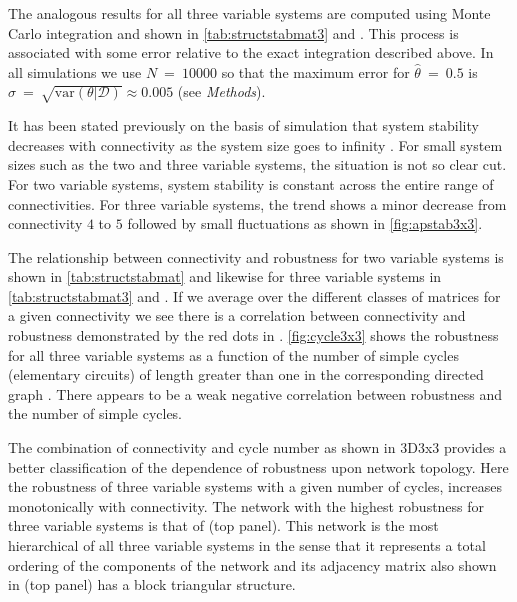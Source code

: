 The analogous results for all three variable systems are computed using Monte Carlo integration and shown in \ref{tab:structstabmat3} and . This process is associated with some error relative to the exact integration described above. In all simulations we use $N~=~10000$ so that the maximum error for $\hat{\theta}~=~0.5$ is $\sigma~=~\sqrt{\mathrm{var}(\theta | \mathcal{D})} \approx 0.005$ (see \emph{Methods}).

It has been stated previously on the basis of simulation that system stability decreases with connectivity as the system size goes to infinity \cite{May1972}. For small system sizes such as the two and three variable systems, the situation is not so clear cut. For two variable systems, system stability is constant across the entire range of connectivities. For three variable systems, the trend shows a minor decrease from connectivity $4$ to $5$ followed by small fluctuations as shown in \ref{fig:apstab3x3}.

The relationship between connectivity and robustness for two variable systems is shown in \ref{tab:structstabmat} and likewise for three variable systems in \ref{tab:structstabmat3} and . If we average over the different classes of matrices for a given connectivity we see there is a correlation between connectivity and robustness demonstrated by the red dots in .
\ref{fig:cycle3x3} shows the robustness for all three variable systems as a function of the number of simple cycles (elementary circuits) of length greater than one in the corresponding directed graph \cite{Johnson1975}. There appears to be a weak negative correlation between robustness and the number of simple cycles.

The combination of connectivity and cycle number as shown in 3D3x3 provides a better classification of the dependence of robustness upon network topology. Here the robustness of three variable systems with a given number of cycles, increases monotonically with connectivity. The network with the highest robustness for three variable systems is that of  (top panel). This network is the most hierarchical of all three variable systems in the sense that it represents a total ordering of the components of the network and its adjacency matrix also shown in  (top panel) has a block triangular structure.

